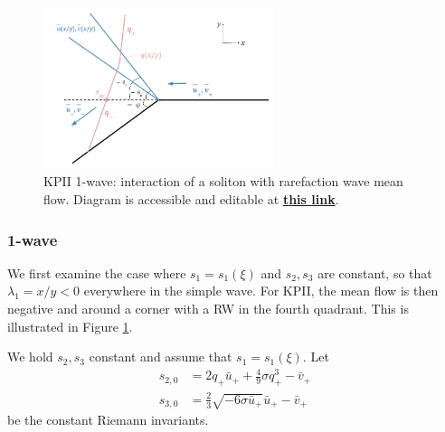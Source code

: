 \documentclass[12pt]{article}
\numberwithin{equation}{section}
\begin{document}
\begin{figure}
    \centering
    \includegraphics[width = 0.6\textwidth]{figures/KPII RW soliton interaction.jpg}
    \caption{KPII 1-wave: interaction of a soliton with rarefaction wave mean flow. Diagram is accessible and editable at \href{https://docs.google.com/drawings/d/1fx1p1iLIPBzyM74Fr5_Aun8OyIP53FncyBJjeWmVurA/edit}{\bf this link}.}
    \label{fig:KPII 1-wave}
\end{figure}

\subsubsection{1-wave} \label{sec: 1wave}


We first examine the case where $s_1 = s_1(\xi)$ and $s_2,s_3$ are constant, so that $\lambda_1 = x/y <0$ everywhere in the simple wave. For KPII, the mean flow is then negative and around a corner with a RW in the fourth quadrant. This is illustrated in Figure \ref{fig:KPII 1-wave}.

We hold $s_2,s_3$ constant and assume that $s_1 = s_1(\xi)$. Let 
\begin{align}
    s_{2,0} &= 2q_+\bar u_+ + \frac{4}{9}\sigma q_+^3 - \bar v_+ \\
    s_{3,0} &= \frac{2}{3}\sqrt{-6\sigma\bar u_+}\bar u_+ - \bar v_+
\end{align}
be the constant Riemann invariants.
\end{document}
